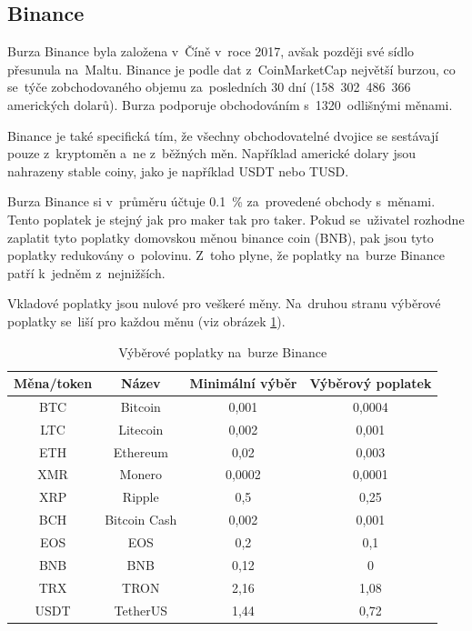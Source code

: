 \documentclass[thesis=B,czech]{FITthesis}[2019/03/21]
\begin{document}

\subsection{Binance}
Burza Binance byla založena v~Číně v~roce 2017, avšak později své sídlo přesunula na~Maltu. Binance je podle dat z~CoinMarketCap největší burzou, co se~týče zobchodovaného objemu za~posledních 30 dní (158~302~486~366 amerických dolarů). \cite{coinmarketcap} Burza podporuje obchodováním s~1320~odlišnými měnami.

Binance je také specifická tím, že všechny obchodovatelné dvojice se  \linebreak sestávají pouze z~kryptoměn a~ne z~běžných měn. Například americké dolary jsou nahrazeny stable coiny, jako je například USDT nebo TUSD. 

Burza Binance si v~průměru účtuje 0.1~\% za~provedené obchody s~měnami. Tento poplatek je stejný jak pro maker tak pro taker. Pokud se~uživatel rozhodne zaplatit tyto poplatky domovskou měnou binance coin (BNB), pak jsou tyto poplatky redukovány o~polovinu. Z~toho plyne, že poplatky na~burze Binance patří k~jedněm z~nejnižších.

Vkladové poplatky jsou nulové pro veškeré měny. Na~druhou stranu \linebreak výběrové poplatky se~liší pro každou měnu (viz obrázek \ref{binance_fees}). \cite{blockonomi_binance}

\begin{table}\centering
    \caption{Výběrové poplatky na~burze Binance \cite{binance_fees}}
    \label{binance_fees}
     \begin{tabular}{||c | c | c | c||} 
     \hline
     Měna/token & Název & Minimální výběr & Výběrový poplatek \\ [0.5ex] 
     \hline\hline
     BTC & Bitcoin & 0,001 & 0,0004 \\ 
     \hline
     LTC & Litecoin & 0,002 & 0,001 \\
     \hline
     ETH & Ethereum & 0,02 & 0,003 \\
     \hline
     XMR & Monero & 0,0002 & 0,0001 \\
     \hline
     XRP & Ripple & 0,5 & 0,25 \\
     \hline
     BCH & Bitcoin Cash & 0,002 & 0,001 \\
     \hline
     EOS & EOS & 0,2 & 0,1 \\
     \hline
     BNB & BNB & 0,12 & 0 \\
     \hline
     TRX & TRON & 2,16 & 1,08 \\
     \hline
     USDT & TetherUS & 1,44 & 0,72 \\
     \hline
    \end{tabular}
\end{table}
\end{document}
